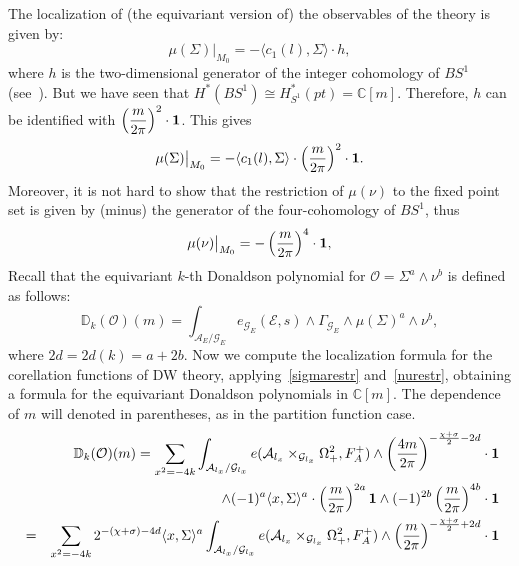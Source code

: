 \documentclass[a4paper,12pt,reqno,sumlimits]{amsart}
\theoremstyle{plain}
\theoremstyle{definition}
\newcommand{\C}{{\mathbb C}}
\newcommand{\D}{{\mathbb D}}
\newcommand{\1}{{\bf 1}}
\newcommand{\calA}{{\mathcal A}}
\newcommand{\calE}{{\mathcal E}}
\newcommand{\calG}{{\mathcal G}}
\newcommand{\calO}{{\mathcal O}}
\newcommand{\ip}[1]{\langle #1 \rangle}
\numberwithin{equation}{section}
\begin{document}
The localization of (the equivariant version of) the observables of the
theory is given by:
$$
\mu(\Sigma)\big|_{M_0}=-\ip{c_1(l),\Sigma}\cdot h,
$$
where $h$ is the two-dimensional generator of the integer cohomology of
$BS^1$ (see~\cite[p. 187]{dk}). But we have seen that $H^*(BS^1)\cong
H^*_{S^1}(pt)=\C[m]$.  Therefore, $h$ can be identified with
$\displaystyle\left(\frac{m}{2\pi}\right)^2\cdot\1$. This gives
\begin{equation}
  \label{sigmarestr}
  \mu(\Sigma)\big|_{M_0}=-\ip{c_1(l),\Sigma}\cdot\left(\frac{m}{2\pi}\right)^2\cdot\1.
\end{equation}
Moreover, it is not hard to show that the restriction of $\mu(\nu)$ to the
fixed point set is given by (minus) the generator of the four-cohomology of
$BS^1$, thus
\begin{equation}
  \label{nurestr}
  \mu(\nu)\big|_{M_0}=-\left(\frac{m}{2\pi}\right)^4\cdot\1,
\end{equation}
Recall that the equivariant $k$-th Donaldson polynomial for
$\calO=\Sigma^a\wedge\nu^b$ is defined as follows:
\begin{equation}
  \D_k(\calO)(m)=\int_{{\calA}_E/{\calG}_E}
  e_{\calG_E}(\calE,s)\wedge\Gamma_{\calG_E}
  \wedge\mu(\Sigma)^a\wedge\nu^b,
\end{equation}
where $2d=2d(k)=a+2b$. Now we compute the localization formula for the
corellation functions of DW theory, applying~\eqref{sigmarestr}
and~\eqref{nurestr}, obtaining a formula for the equivariant Donaldson
polynomials in $\C[m]$.  The dependence of $m$ will denoted in parentheses,
as in the partition function case.
\begin{eqnarray}
  \label{dwobs1}
  &&\D_k(\calO)(m)=\sum_{x^2=-4k}\int_{\calA_{l_x}/\calG_{l_x}}
  e(\calA_{l_x}\times_{\calG_{l_x}}\Omega^2_+,F_A^+)\wedge
  \left(\frac{4m}{2\pi}\right)^{-\frac{\chi+\sigma}{2}-2d}\cdot\1\nonumber\\
  &&\qquad\qquad\qquad\qquad\wedge(-1)^{a}\ip{x,\Sigma}^{a}\cdot\left(\frac{m}{2\pi}\right)^{2a}\1
  \wedge(-1)^{2b}\left(\frac{m}{2\pi}\right)^{4b}\cdot\1\nonumber\\
  &=&\sum_{x^2=-4k}2^{-(\chi+\sigma)-4d}\ip{x,\Sigma}^{a}
  \int_{\calA_{l_x}/\calG_{l_x}} e(\calA_{l_x}\times_{\calG_{l_x}}\Omega^2_+,F_A^+)\wedge
  \left(\frac{m}{2\pi}\right)^{-\frac{\chi+\sigma}{2}+2d}\cdot\1\nonumber\\
  \,
\end{eqnarray}
\end{document}
